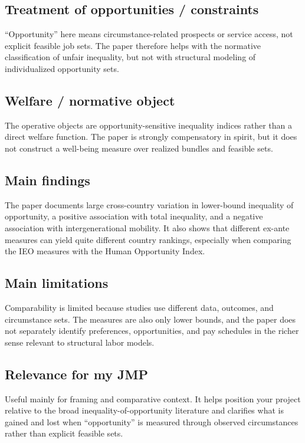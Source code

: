 \documentclass[11pt,a4paper]{article}
\begin{document}
\subsection*{Treatment of opportunities / constraints}
“Opportunity” here means circumstance-related prospects or service access, not explicit feasible job sets. The paper therefore helps with the normative classification of unfair inequality, but not with structural modeling of individualized opportunity sets.

\subsection*{Welfare / normative object}
The operative objects are opportunity-sensitive inequality indices rather than a direct welfare function. The paper is strongly compensatory in spirit, but it does not construct a well-being measure over realized bundles and feasible sets.

\subsection*{Main findings}
The paper documents large cross-country variation in lower-bound inequality of opportunity, a positive association with total inequality, and a negative association with intergenerational mobility. It also shows that different ex-ante measures can yield quite different country rankings, especially when comparing the IEO measures with the Human Opportunity Index.

\subsection*{Main limitations}
Comparability is limited because studies use different data, outcomes, and circumstance sets. The measures are also only lower bounds, and the paper does not separately identify preferences, opportunities, and pay schedules in the richer sense relevant to structural labor models.

\subsection*{Relevance for my JMP}
Useful mainly for framing and comparative context. It helps position your project relative to the broad inequality-of-opportunity literature and clarifies what is gained and lost when “opportunity” is measured through observed circumstances rather than explicit feasible sets.
\end{document}
